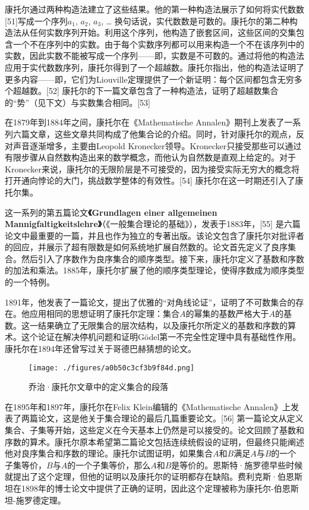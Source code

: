 康托尔通过两种构造法建立了这些结果。他的第一种构造法展示了如何将实代数数[51]写成一个序列\(a_1\), \(a_2\), \(a_3\), … 换句话说，实代数数是可数的。康托尔的第二种构造法从任何实数序列开始。利用这个序列，他构造了嵌套区间，这些区间的交集包含一个不在序列中的实数。由于每个实数序列都可以用来构造一个不在该序列中的实数，因此实数不能被写成一个序列——即，实数是不可数的。通过将他的构造法应用于实代数数序列，康托尔得到了一个超越数。康托尔指出，他的构造法证明了更多内容——即，它们为Liouville定理提供了一个新证明：每个区间都包含无穷多个超越数。[52] 康托尔的下一篇文章包含了一种构造法，证明了超越数集合的“势”（见下文）与实数集合相同。[53]

在1879年到1884年之间，康托尔在《Mathematische Annalen》期刊上发表了一系列六篇文章，这些文章共同构成了他集合论的介绍。同时，针对康托尔的观点，反对声音逐渐增多，主要由Leopold Kronecker领导。Kronecker只接受那些可以通过有限步骤从自然数构造出来的数学概念，而他认为自然数是直观上给定的。对于Kronecker来说，康托尔的无限阶层是不可接受的，因为接受实际无穷大的概念将打开通向悖论的大门，挑战数学整体的有效性。[54] 康托尔在这一时期还引入了康托尔集。

这一系列的第五篇论文\textbf{《Grundlagen einer allgemeinen Mannigfaltigkeitslehre》}（《一般集合理论的基础》），发表于1883年，[55] 是六篇论文中最重要的一篇，并且也作为独立的专著出版。该论文包含了康托尔对批评者的回应，并展示了超有限数是如何系统地扩展自然数的。论文首先定义了良序集合。然后引入了序数作为良序集合的顺序类型。接下来，康托尔定义了基数和序数的加法和乘法。1885年，康托尔扩展了他的顺序类型理论，使得序数成为顺序类型的一个特例。

1891年，他发表了一篇论文，提出了优雅的“对角线论证”，证明了不可数集合的存在。他应用相同的思想证明了康托尔定理：集合\(A\)的幂集的基数严格大于\(A\)的基数。这一结果确立了无限集合的层次结构，以及康托尔所定义的基数和序数的算术。这个论证在解决停机问题和证明Gödel第一不完全性定理中具有基础性作用。康托尔在1894年还曾写过关于哥德巴赫猜想的论文。
\begin{figure}[ht]
\centering
\texttt{[image: ./figures/a0b50c3cf3b9f84d.png]}
\caption{乔治·康托尔文章中的定义集合的段落} \label{fig_Canto_4}
\end{figure}
在1895年和1897年，康托尔在Felix Klein编辑的《Mathematische Annalen》上发表了两篇论文，这是他关于集合理论的最后几篇重要论文。[56] 第一篇论文从定义集合、子集等开始，这些定义在今天基本上仍然是可以接受的。论文回顾了基数和序数的算术。康托尔原本希望第二篇论文包括连续统假设的证明，但最终只能阐述他对良序集合和序数的理论。康托尔试图证明，如果集合\(A\)和\(B\)满足\(A\)与\(B\)的一个子集等价，\(B\)与\(A\)的一个子集等价，那么\(A\)和\(B\)是等价的。恩斯特·施罗德早些时候就提出了这个定理，但他的证明以及康托尔的证明都存在缺陷。费利克斯·伯恩斯坦在1898年的博士论文中提供了正确的证明，因此这个定理被称为康托尔-伯恩斯坦-施罗德定理。

